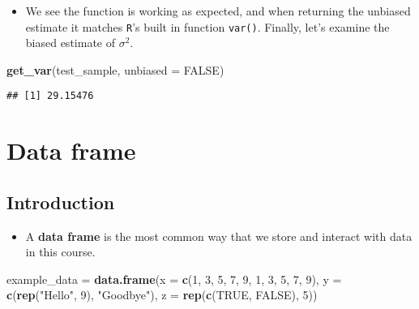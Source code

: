\documentclass[]{book}
\newenvironment{Shaded}{\begin{snugshade}}{\end{snugshade}}
\newcommand{\KeywordTok}[1]{\textcolor[rgb]{0.13,0.29,0.53}{\textbf{#1}}}
\newcommand{\DataTypeTok}[1]{\textcolor[rgb]{0.13,0.29,0.53}{#1}}
\newcommand{\DecValTok}[1]{\textcolor[rgb]{0.00,0.00,0.81}{#1}}
\newcommand{\StringTok}[1]{\textcolor[rgb]{0.31,0.60,0.02}{#1}}
\newcommand{\OtherTok}[1]{\textcolor[rgb]{0.56,0.35,0.01}{#1}}
\newcommand{\NormalTok}[1]{#1}
\providecommand{\tightlist}{%
  \setlength{\itemsep}{0pt}\setlength{\parskip}{0pt}}
\begin{document}
\begin{itemize}
\tightlist
\item
  We see the function is working as expected, and when returning the
  unbiased estimate it matches \texttt{R}'s built in function
  \texttt{var()}. Finally, let's examine the biased estimate of
  \(\sigma^2\).
\end{itemize}

\begin{Shaded}
\begin{Highlighting}[]
\KeywordTok{get_var}\NormalTok{(test_sample, }\DataTypeTok{unbiased =} \OtherTok{FALSE}\NormalTok{)}
\end{Highlighting}
\end{Shaded}

\begin{verbatim}
## [1] 29.15476
\end{verbatim}

\chapter{Data frame}\label{data-frame}

\section{Introduction}\label{introduction}

\begin{itemize}
\tightlist
\item
  A \textbf{data frame} is the most common way that we store and
  interact with data in this course.
\end{itemize}

\begin{Shaded}
\begin{Highlighting}[]
\NormalTok{example_data =}\StringTok{ }\KeywordTok{data.frame}\NormalTok{(}\DataTypeTok{x =} \KeywordTok{c}\NormalTok{(}\DecValTok{1}\NormalTok{, }\DecValTok{3}\NormalTok{, }\DecValTok{5}\NormalTok{, }\DecValTok{7}\NormalTok{, }\DecValTok{9}\NormalTok{, }\DecValTok{1}\NormalTok{, }\DecValTok{3}\NormalTok{, }\DecValTok{5}\NormalTok{, }\DecValTok{7}\NormalTok{, }\DecValTok{9}\NormalTok{),}
                          \DataTypeTok{y =} \KeywordTok{c}\NormalTok{(}\KeywordTok{rep}\NormalTok{(}\StringTok{"Hello"}\NormalTok{, }\DecValTok{9}\NormalTok{), }\StringTok{"Goodbye"}\NormalTok{),}
                          \DataTypeTok{z =} \KeywordTok{rep}\NormalTok{(}\KeywordTok{c}\NormalTok{(}\OtherTok{TRUE}\NormalTok{, }\OtherTok{FALSE}\NormalTok{), }\DecValTok{5}\NormalTok{))}
\end{Highlighting}
\end{Shaded}
\end{document}

